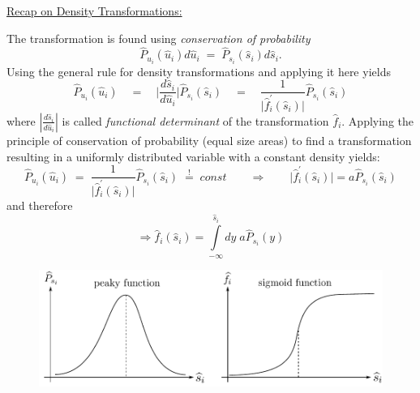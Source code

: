 \underline{Recap on Density Transformations:}

The transformation is found using \emph{conservation of probability}
\begin{equation}
	\widehat{P}_{u_i}(\widehat{u}_i) d \widehat{u}_i 
	\; =  \; \widehat{P}_{s_i} (\widehat{s}_i) d \widehat{s}_i.
\end{equation}
Using the general rule for density transformations and applying it here yields
\begin{equation}
\label{eq:conservation1}
	\widehat{P}_{u_i}(\widehat{u}_i) \quad
	 =  \quad \bigg| 
		\frac{d \widehat{s}_i}{d \widehat{u}_i} \bigg| 
			 \widehat{P}_{s_i}(\widehat{s}_i) \quad
	 =  \quad \frac{1}{\big| \widehat{f}_i^{'} (\widehat{s}_i) \big|} 
		\widehat{P}_{s_i}(\widehat{s}_i)
\end{equation}
where $\left|\frac{d \widehat{s}_i}{d \widehat{u}_i} \right|$ is
called \emph{functional determinant} of the transformation
$\widehat{f}_i$.
Applying the principle of conservation of probability (equal size
areas) to find a transformation resulting in a uniformly distributed
variable with a constant density yields: 
\begin{equation}
  \label{eq:dtufs}
		\widehat{P}_{u_i} (\widehat{u}_i) \; = \;   
		 \frac{1}{\big| \widehat{f}_i^{'} (\widehat{s}_i) \big|} 
		\widehat{P}_{s_i}(\widehat{s}_i) \; \stackrel{!}{=} \; const \qquad \Rightarrow \qquad 
		 \big| \widehat{f}_i^{'} (\widehat{s}_i) \big| =  a \widehat{P}_{s_i}(\widehat{s}_i) 
\end{equation}
and therefore
\begin{equation}
\Rightarrow \widehat{f}_i (\widehat{s}_i)
 = \int\limits_{-\infty}^{\widehat{s}_i} dy\; a 
			\widehat{P}_{s_i}(y)
\end{equation}

\begin{figure}[h]
  \centering
  \includegraphics[width=12cm]{img/section2_fig15}  
  \label{fig:cdf}
\end{figure}

